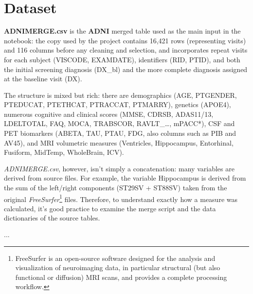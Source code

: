 \section{Dataset}
\textbf{ADNIMERGE.csv} is the \textbf{ADNI} merged table used as the main input in the notebook: the copy used by the project contains 16,421 rows (representing visits) and 116 columns before any cleaning and selection, and incorporates repeat visits for each subject (VISCODE, EXAMDATE), identifiers (RID, PTID), and both the initial screening diagnosis (DX\_bl) and the more complete diagnosis assigned at the baseline visit (DX).

The structure is mixed but rich: there are demographics (AGE, PTGENDER, PTEDUCAT, PTETHCAT, PTRACCAT, PTMARRY), genetics (APOE4), numerous cognitive and clinical scores (MMSE, CDRSB, ADAS11/13, LDELTOTAL, FAQ, MOCA, TRABSCOR, RAVLT\_…, mPACC*), CSF and PET biomarkers (ABETA, TAU, PTAU, FDG, also columns such as PIB and AV45), and MRI volumetric measures (Ventricles, Hippocampus, Entorhinal, Fusiform, MidTemp, WholeBrain, ICV).

\textit{ADNIMERGE.csv}, however, isn't simply a concatenation: many variables are derived from source files. For example, the variable Hippocampus is derived from the sum of the left/right components (ST29SV + ST88SV) taken from the original \textit{FreeSurfer}\footnote{FreeSurfer is an open-source software designed for the analysis and visualization of neuroimaging data, in particular structural (but also functional or diffusion) MRI scans, and provides a complete processing workflow.} files. Therefore, to understand exactly how a measure was calculated, it's good practice to examine the merge script and the data dictionaries of the source tables. 




...


